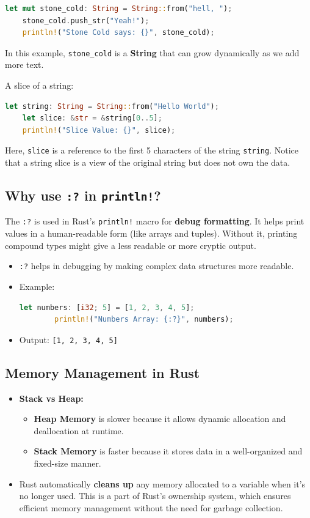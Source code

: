 \documentclass[a4paper,12pt]{report}
\begin{document}
\begin{lstlisting}[language=Rust]
	let mut stone_cold: String = String::from("hell, ");
	stone_cold.push_str("Yeah!");
	println!("Stone Cold says: {}", stone_cold);
\end{lstlisting}

	\noindent In this example, \texttt{stone\_cold} is a \textbf{String} that can grow dynamically as we add more text.

A slice of a string:

\begin{lstlisting}[language=Rust]
	let string: String = String::from("Hello World");
	let slice: &str = &string[0..5];
	println!("Slice Value: {}", slice);
\end{lstlisting}

	\noindent Here, \texttt{slice} is a reference to the first 5 characters of the string \texttt{string}. Notice that a string slice is a view of the original string but does not own the data.

\subsection*{Why use \texttt{:?} in \texttt{println!}?}
The \texttt{:?} is used in Rust’s \texttt{println!} macro for \textbf{debug formatting}. It helps print values in a human-readable form (like arrays and tuples). Without it, printing compound types might give a less readable or more cryptic output.

\begin{itemize}
	\item \texttt{:?} helps in debugging by making complex data structures more readable.
	\item Example:
	\begin{lstlisting}[language=Rust]
		let numbers: [i32; 5] = [1, 2, 3, 4, 5];
		println!("Numbers Array: {:?}", numbers);
	\end{lstlisting}
	\item Output: \texttt{[1, 2, 3, 4, 5]}
\end{itemize}

\subsection*{Memory Management in Rust}

\begin{itemize}
	\item \textbf{Stack vs Heap:}
	\begin{itemize}
		\item \textbf{Heap Memory} is slower because it allows dynamic allocation and deallocation at runtime.
		\item \textbf{Stack Memory} is faster because it stores data in a well-organized and fixed-size manner.
	\end{itemize}
	\item Rust automatically \textbf{cleans up} any memory allocated to a variable when it's no longer used. This is a part of Rust's ownership system, which ensures efficient memory management without the need for garbage collection.
\end{itemize}
\end{document}
